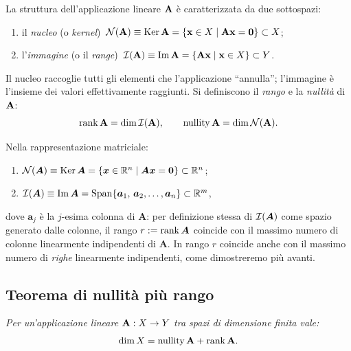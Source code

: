 La struttura dell'applicazione lineare $\mathbf{A}$ \`e caratterizzata da due sottospazi:
\begin{enumerate}[label=(\roman*)]
	\item il \textit{nucleo} (o \textit{kernel})\, $\mathcal{N}(\mathbf{A}) \equiv \operatorname{Ker}\mathbf{A}=\{\mathbf{x}\in X \mid \mathbf{A}\mathbf{x}=\mathbf{0} \}\subset X$;
	\item l'\textit{immagine} (o il \textit{range})\, $\mathcal{I}(\mathbf{A}) \equiv \operatorname{Im}\mathbf{A}=\{ \mathbf{A}\mathbf{x} \mid \mathbf{x}\in X \}\subset Y$.
\end{enumerate}
Il nucleo raccoglie tutti gli elementi che l'applicazione ``annulla''; l'immagine \`e l'insieme dei valori effettivamente raggiunti. Si definiscono il \textit{rango} e la \textit{nullit\`a} di $\mathbf{A}$:
\begin{equation}
	\operatorname{rank}\mathbf{A}=\dim\mathcal{I}(\mathbf{A}), \qquad \operatorname{nullity}\mathbf{A}=\dim\mathcal{N}(\mathbf{A}).
\end{equation}

Nella rappresentazione matriciale:
	\begin{enumerate}[label=(\roman*)]
		\item $\mathcal{N}(\bm{A}) \equiv \operatorname{Ker} \bm{A}=\{\bm{x}\in \mathbb{R}^{n} \mid \bm{A} \bm{x}=\bm{0} \}\subset \mathbb{R}^{n}$;
		\item $\mathcal{I}(\bm{A}) \equiv \operatorname{Im}\bm{A}=\operatorname{Span} \{\bm{a}_1,\,\bm{a}_2, \ldots, \bm{a}_n\}\subset \mathbb{R}^{m}$,
	\end{enumerate}
	dove $\bm{a}_j$ \`e la $j$-esima colonna di $\bm{A}$: per definizione stessa di $\mathcal{I}(\bm{A})$ come spazio generato dalle colonne, il rango $r:=\operatorname{rank}\bm{A}$ coincide con il massimo numero di colonne linearmente indipendenti di $\bm{A}$. In rango $r$ coincide anche con il massimo numero di \textit{righe} linearmente indipendenti, come dimostreremo più avanti. 


\subsection{Teorema di nullit\`a pi\`u rango}

	\emph{Per un'applicazione lineare $\mathbf{A}: X \rightarrow Y$ tra spazi di dimensione finita vale:
	\begin{equation}\label{eq:null_rango}
		\dim X = \operatorname{nullity}\mathbf{A} + \operatorname{rank}\mathbf{A}.
	\end{equation}
}

